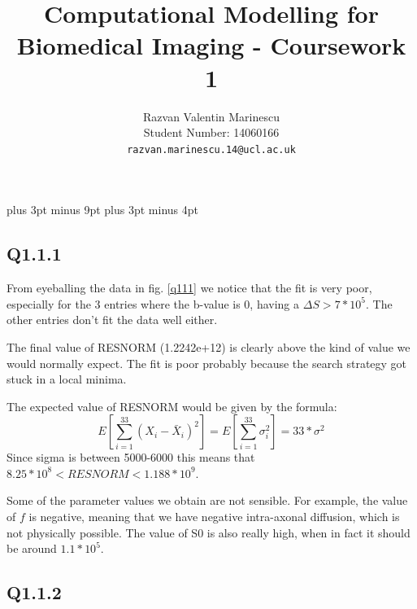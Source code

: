 \documentclass[11pt,a4paper,oneside]{report}
\title{Computational Modelling for Biomedical Imaging - Coursework 1}
\author{
Razvan Valentin Marinescu\\
Student Number: 14060166\\
\texttt{razvan.marinescu.14@ucl.ac.uk}
}
\begin{document}
\belowdisplayskip=12pt plus 3pt minus 9pt
\belowdisplayshortskip=7pt plus 3pt minus 4pt
\maketitle{}


\subsection*{Q1.1.1}




From eyeballing the data in fig. \ref{q111} we notice that the fit is very poor, especially for the 3 entries where the b-value is 0, having a $\Delta S > 7 * 10^5$. The other entries don't fit the data well either.


The final value of RESNORM (1.2242e+12) is clearly above the kind of value we would normally expect. The fit is poor probably because the search strategy got stuck in a local minima.

 

The expected value of RESNORM would be given by the formula:
$$E\left[\sum_{i=1}^{33} (X_i - \bar{X}_i)^2\right] = E\left[\sum_{i=1}^{33} \sigma_i^2\right] = 33 * \sigma^2 $$
Since sigma is between 5000-6000 this means that $ 8.25*10^8 < RESNORM < 1.188 * 10^9$.


Some of the parameter values we obtain are not sensible. For example, the value of $f$ is negative, meaning that we have negative intra-axonal diffusion, which is not physically possible. The value of S0 is also really high, when in fact it should be around $1.1 * 10^5$. 


\subsection*{Q1.1.2}
\end{document}

